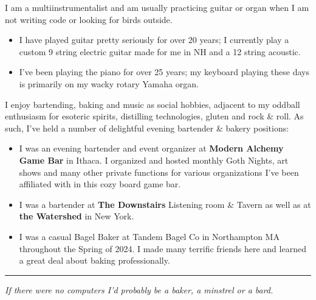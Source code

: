 \documentclass[11pt,letterpaper]{article}
\begin{document}
I am a multiinstrumentalist and am usually practicing guitar or organ when I am not writing code or looking for birds outside.

\begin{itemize}
    \item I have played guitar pretty seriously for over 20 years; I currently play a custom 9 string electric guitar made for me in NH and a 12 string acoustic.
    \item I've been playing the piano for over 25 years; my keyboard playing these days is primarily on my wacky rotary Yamaha organ.
\end{itemize}

I enjoy bartending, baking and music as social hobbies, adjacent to my oddball enthusiasm for esoteric spirits, distilling technologies, gluten and rock \& roll. As such, I've held a number of delightful evening bartender \& bakery positions:

\begin{itemize}
    \item I was an evening bartender and event organizer at \textbf{Modern Alchemy Game Bar} in Ithaca. I organized and hosted monthly Goth Nights, art shows and many other private functions for various organizations I've been affiliated with in this cozy board game bar.
    \item I was a bartender at \textbf{The Downstairs} Listening room \& Tavern as well as at \textbf{the Watershed} in New York.
    \item I was a casual Bagel Baker at Tandem Bagel Co in Northampton MA throughout the Spring of 2024. I made many terrific friends here and learned a great deal about baking professionally.
\end{itemize}

\vspace{1.5em}

\begin{center}
    \textcolor{muted}{\rule{0.4\textwidth}{0.5pt}}
    
    \vspace{0.8em}
    
    {\large\itshape\color{muted} If there were no computers I'd probably be a baker, a minstrel or a bard.}
\end{center}


\vfill

\begin{center}
\end{center}
\end{document}
